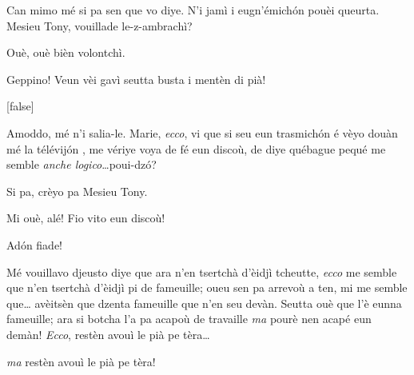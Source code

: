 \begin{drama}

\Mariespeaks Can mimo mé si pa sen que vo diye. N'i jamì i eugn'émich\'on pouèi queurta. Mesieu Tony, vouillade le-z-ambrachì?

\Turispeaks Ouè, ouè bièn volontchì.

\Mariespeaks{} Geppino! Veun vèi gavì seutta busta i mentèn di pià!

[false]%



\Turispeaks Amoddo, mé n'i salia-le. Marie, \textit{ecco}, vi que si seu eun trasmich\'on é vèyo douàn mé la télévij\'on , me vériye voya de fé eun discoù, de diye québague pequé me semble \textit{anche logico}\ldots poui-dz\'o?


\Mariespeaks{} Si pa, crèyo pa Mesieu Tony.

\Turispeaks{} Mi ouè, alé! Fio vito eun discoù!

\Mariespeaks{} Ad\'on fiade!


\Turispeaks Mé vouillavo djeusto diye que ara n'en tsertchà d'èi\-djì tcheutte, \textit{ecco} me semble que n'en tsertchà d'èidjì pi de fameuille; oueu sen pa arrevoù a ten, mi me semble que\ldots {} avèitsèn que dzenta fameuille que n'en seu devàn. Seutta ouè que l'è eunna fameuille; ara si botcha l'a pa acapoù de travaille \textit{ma} pourè nen acapé eun demàn! \textit{Ecco}, restèn avouì le pià pe tèra\ldots


\Turispeaks \textit{ma} restèn avouì le pià pe tèra!



\end{drama}
